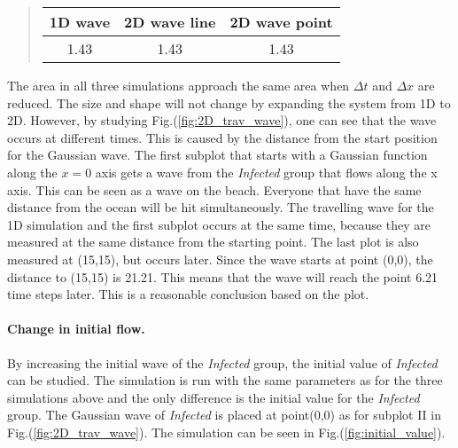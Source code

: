 \documentclass[%
twoside,                 %
final,                   %
chapterprefix=true,      %
open=right               %
10pt]{book}
\begin{document}

\label{table:wave_values}

\begin{quote}
\begin{tabular}{ccc}
\hline
\multicolumn{1}{c}{ 1D wave } & \multicolumn{1}{c}{ 2D wave line } & \multicolumn{1}{c}{ 2D wave point } \\
\hline
1.43    & 1.43         & 1.43          \\
\hline
\end{tabular}
\end{quote}

\noindent
The area in all three simulations approach the same area when $\Delta t$ and $\Delta x$ are reduced. The size and shape will not change by  expanding the system from 1D to 2D. However, by studying Fig.(\ref{fig:2D_trav_wave}), one can see that the wave occurs at different times. This is caused by the distance from the start position for the Gaussian wave. The first subplot that starts with a Gaussian function along the $x=0$ axis gets a wave from the \emph{Infected} group that flows along the x axis. This can be seen as a wave on the beach. Everyone that have the same distance from the ocean will be hit simultaneously. The travelling wave for the 1D simulation and the first subplot occurs at the same time, because they are measured at the same distance from the starting point. The last plot is also measured at (15,15), but occurs later. Since the wave starts at point (0,0), the distance to (15,15) is 21.21. This means that the wave will reach the point 6.21 time steps later. This is a reasonable conclusion based on the plot.    

\paragraph{Change in initial flow.}
By increasing the initial wave of the \emph{Infected} group, the initial value of \emph{Infected} can be studied. The simulation is run with the same parameters as for the three simulations above and the only difference is the initial value for the \emph{Infected} group. The Gaussian wave of \emph{Infected} is placed at point(0,0) as for subplot II in Fig.(\ref{fig:2D_trav_wave}). The simulation can be seen in Fig.(\ref{fig:initial_value}).  
\end{document}
